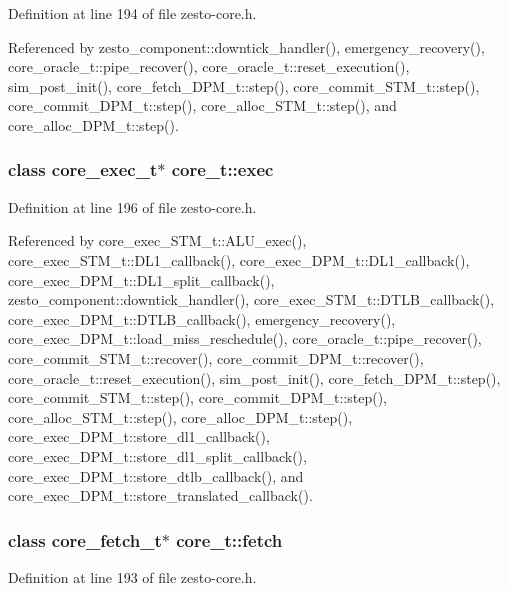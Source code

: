 Definition at line 194 of file zesto-core.h.

Referenced by zesto\_\-component::downtick\_\-handler(), emergency\_\-recovery(), core\_\-oracle\_\-t::pipe\_\-recover(), core\_\-oracle\_\-t::reset\_\-execution(), sim\_\-post\_\-init(), core\_\-fetch\_\-DPM\_\-t::step(), core\_\-commit\_\-STM\_\-t::step(), core\_\-commit\_\-DPM\_\-t::step(), core\_\-alloc\_\-STM\_\-t::step(), and core\_\-alloc\_\-DPM\_\-t::step().
\subsubsection[{exec}]{\setlength{\rightskip}{0pt plus 5cm}class {\bf core\_\-exec\_\-t}$\ast$ {\bf core\_\-t::exec}}\label{classcore__t_fd8831061ddb119a3abe035f7a482b55}




Definition at line 196 of file zesto-core.h.

Referenced by core\_\-exec\_\-STM\_\-t::ALU\_\-exec(), core\_\-exec\_\-STM\_\-t::DL1\_\-callback(), core\_\-exec\_\-DPM\_\-t::DL1\_\-callback(), core\_\-exec\_\-DPM\_\-t::DL1\_\-split\_\-callback(), zesto\_\-component::downtick\_\-handler(), core\_\-exec\_\-STM\_\-t::DTLB\_\-callback(), core\_\-exec\_\-DPM\_\-t::DTLB\_\-callback(), emergency\_\-recovery(), core\_\-exec\_\-DPM\_\-t::load\_\-miss\_\-reschedule(), core\_\-oracle\_\-t::pipe\_\-recover(), core\_\-commit\_\-STM\_\-t::recover(), core\_\-commit\_\-DPM\_\-t::recover(), core\_\-oracle\_\-t::reset\_\-execution(), sim\_\-post\_\-init(), core\_\-fetch\_\-DPM\_\-t::step(), core\_\-commit\_\-STM\_\-t::step(), core\_\-commit\_\-DPM\_\-t::step(), core\_\-alloc\_\-STM\_\-t::step(), core\_\-alloc\_\-DPM\_\-t::step(), core\_\-exec\_\-DPM\_\-t::store\_\-dl1\_\-callback(), core\_\-exec\_\-DPM\_\-t::store\_\-dl1\_\-split\_\-callback(), core\_\-exec\_\-DPM\_\-t::store\_\-dtlb\_\-callback(), and core\_\-exec\_\-DPM\_\-t::store\_\-translated\_\-callback().
\subsubsection[{fetch}]{\setlength{\rightskip}{0pt plus 5cm}class {\bf core\_\-fetch\_\-t}$\ast$ {\bf core\_\-t::fetch}}\label{classcore__t_bb3b5f18fa768382f617bcdec3ee7d7e}




Definition at line 193 of file zesto-core.h.

